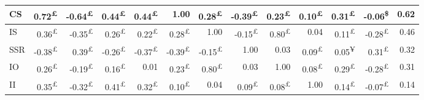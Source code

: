 \documentclass{singlecol-new}
\theoremstyle{TH}{
\newtheorem{lemma}{Lemma}
\newtheorem{theorem}[lemma]{Theorem}
\newtheorem{corrolary}[lemma]{Corrolary}
\newtheorem{conjecture}[lemma]{Conjecture}
\newtheorem{proposition}[lemma]{Proposition}
\newtheorem{claim}[lemma]{Claim}
\newtheorem{stheorem}[lemma]{Wrong Theorem}
\newtheorem{algorithm}{Algorithm}
}
\theoremstyle{THrm}{
\newtheorem{definition}{Definition}[section]
\newtheorem{question}{Question}[section]
\newtheorem{remark}{Remark}
\newtheorem{scheme}{Scheme}
}
\theoremstyle{THhit}{
\newtheorem{case}{Case}[section]
}
\begin{document}
\begin{table*}[h!]
\begin{tabular}{|l|r|r|r|r|r|r|r|r|r|r|r|r|}
		CS & \cellcolor{gray!36}0.72\textsuperscript{£} & \cellcolor{gray!32}-0.64\textsuperscript{£} & \cellcolor{gray!22}0.44\textsuperscript{£} & \cellcolor{gray!22}0.44\textsuperscript{£} & \cellcolor{gray!50}1.00 & \cellcolor{gray!14}0.28\textsuperscript{£} & \cellcolor{gray!19}-0.39\textsuperscript{£} & \cellcolor{gray!11}0.23\textsuperscript{£} & \cellcolor{gray!5}0.10\textsuperscript{£} & \cellcolor{gray!15}0.31\textsuperscript{£} & \cellcolor{gray!3}-0.06\textsuperscript{\$} & 0.62 \\ \hline
		
		IS & \cellcolor{gray!18}0.36\textsuperscript{£} & \cellcolor{gray!17}-0.35\textsuperscript{£} & \cellcolor{gray!13}0.26\textsuperscript{£} & \cellcolor{gray!11}0.22\textsuperscript{£} & \cellcolor{gray!14}0.28\textsuperscript{£} & \cellcolor{gray!50}1.00 & \cellcolor{gray!7}-0.15\textsuperscript{£} & \cellcolor{gray!40}0.80\textsuperscript{£} & \cellcolor{gray!2}0.04 & \cellcolor{gray!5}0.11\textsuperscript{£} & \cellcolor{gray!14}-0.28\textsuperscript{£} & 0.46 \\ \hline
		
		SSR & \cellcolor{gray!19}-0.38\textsuperscript{£} & \cellcolor{gray!19}0.39\textsuperscript{£} & \cellcolor{gray!13}-0.26\textsuperscript{£} & \cellcolor{gray!18}-0.37\textsuperscript{£} & \cellcolor{gray!19}-0.39\textsuperscript{£} & \cellcolor{gray!7}-0.15\textsuperscript{£} & \cellcolor{gray!50}1.00 & \cellcolor{gray!1}0.03 & \cellcolor{gray!4}0.09\textsuperscript{£} & \cellcolor{gray!2}0.05\textsuperscript{¥} & \cellcolor{gray!15}0.31\textsuperscript{£} & 0.32 \\ \hline
		
		IO & \cellcolor{gray!13}0.26\textsuperscript{£} & \cellcolor{gray!9}-0.19\textsuperscript{£} & \cellcolor{gray!8}0.16\textsuperscript{£} & \cellcolor{gray!0}0.01 & \cellcolor{gray!11}0.23\textsuperscript{£} & \cellcolor{gray!40}0.80\textsuperscript{£} & \cellcolor{gray!1}0.03 & \cellcolor{gray!50}1.00 & \cellcolor{gray!4}0.08\textsuperscript{£} & \cellcolor{gray!14}0.29\textsuperscript{£} & \cellcolor{gray!14}-0.28\textsuperscript{£} & 0.31 \\ \hline
		
		II & \cellcolor{gray!17}0.35\textsuperscript{£} & \cellcolor{gray!16}-0.32\textsuperscript{£} & \cellcolor{gray!20}0.41\textsuperscript{£} & \cellcolor{gray!16}0.32\textsuperscript{£} & \cellcolor{gray!5}0.10\textsuperscript{£} & \cellcolor{gray!2}0.04 & \cellcolor{gray!4}0.09\textsuperscript{£} & \cellcolor{gray!4}0.08\textsuperscript{£} & \cellcolor{gray!50}1.00 & \cellcolor{gray!7}0.14\textsuperscript{£} & \cellcolor{gray!3}-0.07\textsuperscript{£} & 0.14 \\ \hline
		

\end{tabular}
\end{table*}
\end{document}
